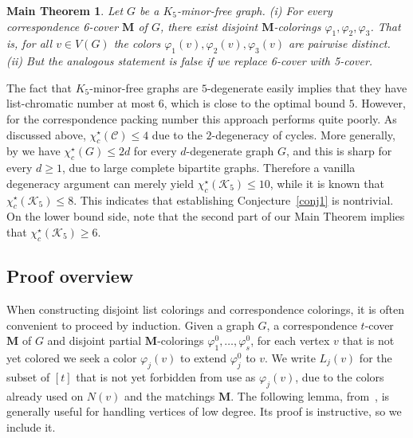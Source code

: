 \documentclass[11pt]{article}
\newtheorem*{mainthm}{Main Theorem}
\theoremstyle{definition}
\newcommand\vph{\varphi}
\newcommand\chisc{\chi^{\star}_{c}}
\renewcommand\ge{\geqslant}
\renewcommand\leq{\leqslant}
\renewcommand\le{\leqslant}
\newcommand\C{\mathcal{C}}
\newcommand\K{\mathcal{K}}
\newcommand\MM{\textbf{M}}
\begin{document}
\begin{mainthm}
	\label{thm1}
	Let $G$ be a $K_5$-minor-free graph.  (i) For every correspondence 6-cover $\MM$ of $G$, 
	there exist disjoint $\MM$-colorings $\vph_1,\vph_2,\vph_3$.  That is, for all $v\in V(G)$ 
	the colors $\vph_1(v),\vph_2(v),\vph_3(v)$ are pairwise distinct.
	(ii) But the analogous statement is false if we replace 6-cover with 5-cover.
\end{mainthm}

The fact that $K_5$-minor-free graphs are $5$-degenerate easily implies that they have list-chromatic number 
at most $6$, which is  close to the optimal bound $5$. However, for the correspondence packing number this 
approach performs quite poorly.  As discussed above, $\chisc(\C) \le 4$ due to the $2$-degeneracy of cycles.
More generally, by  we have $\chisc(G)\leq 2d$ for every $d$-degenerate graph $G$, and this is 
sharp \cite[Prop. 24]{CCvBDK} for every $d \ge 1$, due to large complete bipartite graphs. Therefore a vanilla 
degeneracy argument can merely yield $\chisc(\K_5) \le  10$, while it is known that $\chisc(\K_5)\le 8$. This 
indicates that establishing Conjecture~\ref{conj1} is nontrivial. On the lower bound side, note that the 
second part of our Main Theorem implies that $\chisc(\K_5)\ge 6$.
\bigskip

\subsection{Proof overview}
When constructing disjoint list colorings and correspondence colorings, it is often convenient 
to proceed by induction.  Given a graph $G$, a correspondence $t$-cover $\MM$ of $G$
and disjoint partial $\MM$-colorings $\vph^0_1,\ldots,\vph^0_s$, for each vertex $v$
that is not yet colored we seek a color $\vph_j(v)$ to extend $\vph^0_j$ to $v$.
We write $L_j(v)$ for the subset of $[t]$ that is not yet forbidden from use as 
$\vph_j(v)$, due to the colors already used on $N(v)$ and the matchings $\MM$.
The following lemma, from~\cite{CCvBDK}, is generally useful for handling vertices of low degree.
Its proof is instructive, so we include it.
\end{document}
